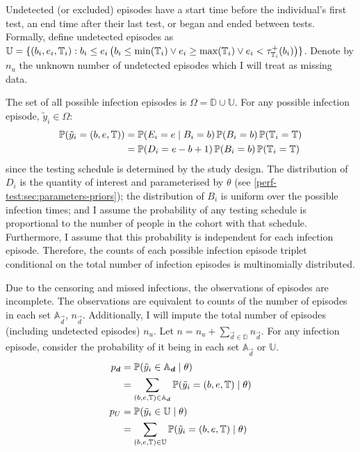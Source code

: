 \documentclass[thesis.tex]{subfiles}
\begin{document}
Undetected (or excluded) episodes have a start time before the individual's first test, an end time after their last test, or began and ended between tests.
Formally, define undetected episodes as $\mathbb{U} = \{ (b_i, e_i, \mathbb{T}_i) : b_i \leq e_i \left( b_i \leq \min(\mathbb{T}_i) \vee e_i \geq \max(\mathbb{T}_i) \vee e_i < \tau^+_{\mathbb{T}_i}(b_i) \right) \}$.
Denote by $n_u$ the unknown number of undetected episodes which I will treat as missing data.

The set of all possible infection episodes is $\Omega = \mathbb{D} \cup \mathbb{U}$.
For any possible infection episode, $\tilde{y}_i \in \Omega$:
\begin{align}
  \operatorname{\mathbb{P}}(\tilde{y}_i = (b, e, \mathbb{T}))
  &= \operatorname{\mathbb{P}}(E_i = e \mid B_i = b) \operatorname{\mathbb{P}}(B_i = b) \operatorname{\mathbb{P}}(\mathbb{T}_i = \mathbb{T}) \\
  &= \operatorname{\mathbb{P}}(D_i = e - b + 1) \operatorname{\mathbb{P}}(B_i = b) \operatorname{\mathbb{P}}(\mathbb{T}_i = \mathbb{T}) \label{perf-test:eq:tildeyi-prob}
\end{align}
since the testing schedule is determined by the study design.
The distribution of $D_i$ is the quantity of interest and parameterised by $\theta$ (see \cref{perf-test:sec:parameters-priors}); the distribution of $B_i$ is uniform over the possible infection times; and I assume the probability of any testing schedule is proportional to the number of people in the cohort with that schedule.
Furthermore, I assume that this probability is independent for each infection episode.
Therefore, the counts of each possible infection episode triplet conditional on the total number of infection episodes is multinomially distributed.

Due to the censoring and missed infections, the observations of episodes are incomplete.
The observations are equivalent to counts of the number of episodes in each set $\mathbb{A}_{\vec{d}}$, $n_{\vec{d}}$.
Additionally, I will impute the total number of episodes (including undetected episodes) $n_u$.
Let $n = n_u + \sum_{\vec{d} \in \mathbb{D}} n_{\vec{d}}$.
For any infection episode, consider the probability of it being in each set $\mathbb{A}_{\vec{d}}$ or $\mathbb{U}$.
\begin{align}
  p_{\bm{d}} 
  &= \operatorname{\mathbb{P}}(\tilde{y}_i \in \mathbb{A}_{\bm{d}} \mid \theta) \\
  &= \sum_{(b, e, \mathbb{T}) \in \mathbb{A}_{\bm{d}}} \operatorname{\mathbb{P}}(\tilde{y}_i = (b, e, \mathbb{T}) \mid \theta) \\
  p_U
  &= \operatorname{\mathbb{P}}(\tilde{y}_i \in \mathbb{U} \mid \theta) \\
  &= \sum_{(b, e, \mathbb{T}) \in \mathbb{U}} \operatorname{\mathbb{P}}(\tilde{y}_i = (b, e, \mathbb{T}) \mid \theta)
\end{align}
\end{document}
